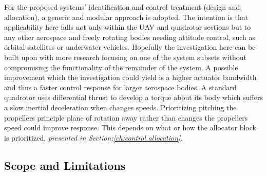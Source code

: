 \par
For the proposed systems' identification and control treatment (design and allocation), a generic and modular approach is adopted. The intention is that applicability here falls not only within the UAV and quadrotor sections but to any other aerospace and freely rotating bodies needing attitude control, such as orbital satellites or underwater vehicles. Hopefully the investigation here can be built upon with more research focusing on one of the system subsets without compromising the functionality of the remainder of the system. A possible improvement which the investigation could yield is a higher actuator bandwidth and thus a faster control response for larger aerospace bodies. A standard quadrotor uses differential thrust to develop a torque about its body which suffers a slow inertial deceleration when changes speeds. Prioritizing pitching the propellers principle plane of rotation away rather than changes the propellers speed could improve response. This depends on what or how the allocator block is prioritized, \emph{presented in Section:\ref{ch:control.allocation}}.
\subsection{Scope and Limitations}
\label{subsec:intro.foreward.scopeandlim}
